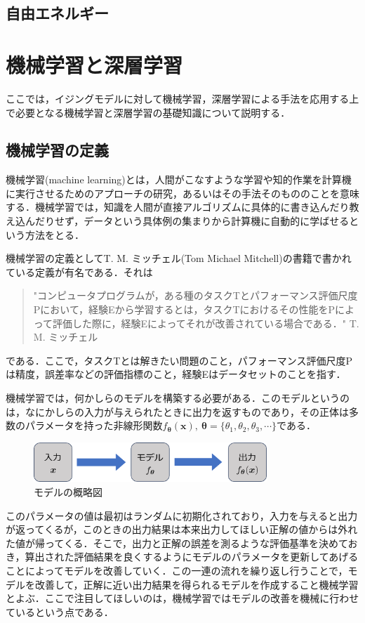 \documentclass[a4paper,11pt]{jsreport}
\begin{document}
\section{自由エネルギー}

\chapter{機械学習と深層学習}
ここでは，イジングモデルに対して機械学習，深層学習による手法を応用する上で必要となる機械学習と深層学習の基礎知識について説明する．
\section{機械学習の定義}
機械学習(machine learning)とは，人間がこなすような学習や知的作業を計算機に実行させるためのアプローチの研究，あるいはその手法そのもののことを意味する．機械学習では，知識を人間が直接アルゴリズムに具体的に書き込んだり教え込んだりせず，データという具体例の集まりから計算機に自動的に学ばせるという方法をとる．\par
機械学習の定義としてT. M. ミッチェル(Tom Michael Mitchell)の書籍\cite{Tom1997Machine}で書かれている定義が有名である．それは
\begin{quote}
  "コンピュータプログラムが，ある種のタスクTとパフォーマンス評価尺度Pにおいて，経験Eから学習するとは，タスクTにおけるその性能をPによって評価した際に，経験Eによってそれが改善されている場合である．"
  \hfill T. M. ミッチェル
\end{quote}
である．ここで，タスクTとは解きたい問題のこと，パフォーマンス評価尺度Pは精度，誤差率などの評価指標のこと，経験Eはデータセットのことを指す．\par
機械学習では，何かしらのモデルを構築する必要がある．このモデルというのは，なにかしらの入力が与えられたときに出力を返すものであり，その正体は多数のパラメータを持った非線形関数$f_{\bm{\theta}}(\bm{x}), \ \bm{\theta} = \{ \theta_1, \theta_2, \theta_3, \cdots \}$である．
\begin{figure}[b]
  \begin{center}
    \includegraphics[height=1.5cm]{image/モデル概略図.png}
    \caption{モデルの概略図}
  \end{center}
\end{figure}
このパラメータの値は最初はランダムに初期化されており，入力を与えると出力が返ってくるが，このときの出力結果は本来出力してほしい正解の値からは外れた値が帰ってくる．そこで，出力と正解の誤差を測るような評価基準を決めておき，算出された評価結果を良くするようにモデルのパラメータを更新してあげることによってモデルを改善していく．この一連の流れを繰り返し行うことで，モデルを改善して，正解に近い出力結果を得られるモデルを作成すること機械学習とよぶ．ここで注目してほしいのは，機械学習ではモデルの改善を機械に行わせているという点である．\par
\end{document}
